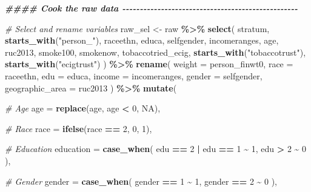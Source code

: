 \documentclass[
]{article}
\newenvironment{Shaded}{\begin{snugshade}}{\end{snugshade}}
\newcommand{\AttributeTok}[1]{\textcolor[rgb]{0.13,0.29,0.53}{#1}}
\newcommand{\CommentTok}[1]{\textcolor[rgb]{0.56,0.35,0.01}{\textit{#1}}}
\newcommand{\ConstantTok}[1]{\textcolor[rgb]{0.56,0.35,0.01}{#1}}
\newcommand{\DecValTok}[1]{\textcolor[rgb]{0.00,0.00,0.81}{#1}}
\newcommand{\DocumentationTok}[1]{\textcolor[rgb]{0.56,0.35,0.01}{\textbf{\textit{#1}}}}
\newcommand{\FunctionTok}[1]{\textcolor[rgb]{0.13,0.29,0.53}{\textbf{#1}}}
\newcommand{\NormalTok}[1]{#1}
\newcommand{\OtherTok}[1]{\textcolor[rgb]{0.56,0.35,0.01}{#1}}
\newcommand{\SpecialCharTok}[1]{\textcolor[rgb]{0.81,0.36,0.00}{\textbf{#1}}}
\newcommand{\StringTok}[1]{\textcolor[rgb]{0.31,0.60,0.02}{#1}}
\begin{document}
\begin{Shaded}
\begin{Highlighting}[]
\DocumentationTok{\#\#\#\# Cook the raw data {-}{-}{-}{-}{-}{-}{-}{-}{-}{-}{-}{-}{-}{-}{-}{-}{-}{-}{-}{-}{-}{-}{-}{-}{-}{-}{-}{-}{-}{-}{-}{-}{-}{-}{-}{-}{-}{-}{-}{-}{-}{-}{-}{-}{-}{-}{-}{-}{-}{-}}


\CommentTok{\# Select and rename variables}
\NormalTok{raw\_sel }\OtherTok{\textless{}{-}}\NormalTok{ raw }\SpecialCharTok{\%\textgreater{}\%} 
    \FunctionTok{select}\NormalTok{(}
\NormalTok{      stratum,}
      \FunctionTok{starts\_with}\NormalTok{(}\StringTok{"person\_"}\NormalTok{),}
\NormalTok{      raceethn,}
\NormalTok{      educa,}
\NormalTok{      selfgender,}
\NormalTok{      incomeranges,}
\NormalTok{      age,}
\NormalTok{      ruc2013,}
\NormalTok{      smoke100,}
\NormalTok{      smokenow,}
\NormalTok{      tobaccotried\_ecig,}
      \FunctionTok{starts\_with}\NormalTok{(}\StringTok{"tobaccotrust"}\NormalTok{),}
      \FunctionTok{starts\_with}\NormalTok{(}\StringTok{"ecigtrust"}\NormalTok{)}
\NormalTok{      ) }\SpecialCharTok{\%\textgreater{}\%}
  \FunctionTok{rename}\NormalTok{(}
    \AttributeTok{weight =}\NormalTok{ person\_finwt0,}
    \AttributeTok{race =}\NormalTok{ raceethn,}
    \AttributeTok{edu =}\NormalTok{ educa,}
    \AttributeTok{income =}\NormalTok{ incomeranges,}
    \AttributeTok{gender =}\NormalTok{ selfgender,}
    \AttributeTok{geographic\_area =}\NormalTok{ ruc2013}
\NormalTok{    ) }\SpecialCharTok{\%\textgreater{}\%}
  \FunctionTok{mutate}\NormalTok{(}
    
    \CommentTok{\# Age}
    \AttributeTok{age =} \FunctionTok{replace}\NormalTok{(age, age }\SpecialCharTok{\textless{}} \DecValTok{0}\NormalTok{, }\ConstantTok{NA}\NormalTok{),}
    
    \CommentTok{\# Race}
    \AttributeTok{race =} \FunctionTok{ifelse}\NormalTok{(race }\SpecialCharTok{==} \DecValTok{2}\NormalTok{, }\DecValTok{0}\NormalTok{, }\DecValTok{1}\NormalTok{),}
    
    \CommentTok{\# Education}
    \AttributeTok{education =} \FunctionTok{case\_when}\NormalTok{(}
\NormalTok{      edu }\SpecialCharTok{==} \DecValTok{2} \SpecialCharTok{|}\NormalTok{ edu }\SpecialCharTok{==} \DecValTok{1} \SpecialCharTok{\textasciitilde{}} \DecValTok{1}\NormalTok{,}
\NormalTok{      edu }\SpecialCharTok{\textgreater{}} \DecValTok{2} \SpecialCharTok{\textasciitilde{}} \DecValTok{0}
\NormalTok{    ),}
    
    \CommentTok{\# Gender}
    \AttributeTok{gender =} \FunctionTok{case\_when}\NormalTok{(}
\NormalTok{      gender }\SpecialCharTok{==} \DecValTok{1} \SpecialCharTok{\textasciitilde{}} \DecValTok{1}\NormalTok{,}
\NormalTok{      gender }\SpecialCharTok{==} \DecValTok{2} \SpecialCharTok{\textasciitilde{}} \DecValTok{0}
\NormalTok{    ),}
    

\end{Highlighting}
\end{Shaded}
\end{document}
